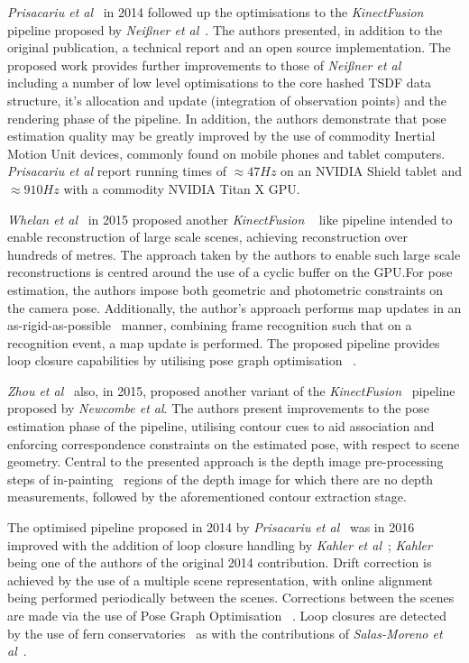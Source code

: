 \textit{Prisacariu et al}~\cite{Prisacariu2014, Kahler2015} in 2014 followed up the optimisations 
to the \textit{KinectFusion} pipeline proposed by \textit{Nei{\ss}ner et al}~\cite{NieBner2013}. 
The authors presented, in addition to the original publication, a technical report and an open 
source implementation. The proposed work provides further improvements to those of 
\textit{Nei{\ss}ner et al}~\cite{NieBner2013} including a number of low level optimisations to the 
core hashed TSDF data structure, it's allocation and update (integration of observation points) and 
the rendering phase of the pipeline. In addition, the authors demonstrate that pose estimation quality 
may be greatly improved by the use of commodity Inertial Motion Unit devices, commonly found 
on mobile phones and tablet computers. \textit{Prisacariu et al} report running times of 
\(\approx47Hz\) on an NVIDIA Shield tablet and \(\approx910Hz\) with a commodity NVIDIA Titan X GPU.\@

\textit{Whelan et al}~\cite{Whelan2015} in 2015 proposed another \textit{KinectFusion} 
~\cite{Newcombe2011} like pipeline intended to enable reconstruction of large scale scenes, 
achieving reconstruction over hundreds of metres. The approach taken by the authors to enable 
such large scale reconstructions is centred around the use of a cyclic buffer on the GPU.\@ For pose 
estimation, the authors impose both geometric and photometric constraints on the camera pose. 
Additionally, the author's approach performs map updates in an as-rigid-as-possible~\cite{Igarashi2005} 
manner, combining frame recognition such that on a recognition event, a map update is performed.
The proposed pipeline provides loop closure capabilities by utilising pose graph optimisation 
~\cite{Grisetti2010}.

\textit{Zhou et al}~\cite{Zhou2015} also, in 2015, proposed another variant of the 
\textit{KinectFusion}~\cite{Newcombe2011} pipeline proposed by \textit{Newcombe et al}.
The authors present improvements to the pose estimation phase of the pipeline, utilising 
contour cues to aid association and enforcing correspondence constraints on the estimated 
pose, with respect to scene geometry. Central to the presented approach is the depth image 
pre-processing steps of in-painting~\cite{Bertalmio2000} regions of the depth image for which 
there are no depth measurements, followed by the aforementioned contour extraction stage.

The optimised pipeline proposed in 2014 by \textit{Prisacariu et al}~\cite{Prisacariu2014} was 
in 2016 improved with the addition of loop closure handling by \textit{Kahler et al}~\cite{Kahler2016}; 
\textit{Kahler} being one of the authors of the original 2014 contribution. Drift correction is achieved 
by the use of a multiple scene representation, with online alignment being performed periodically 
between the scenes. Corrections between the scenes are made via the use of Pose Graph Optimisation 
~\cite{Grisetti2010}. Loop closures are detected by the use of fern conservatories~\cite{Glocker2014} as 
with the contributions of \textit{Salas-Moreno et al}~\cite{Salas-Moreno2013}.

